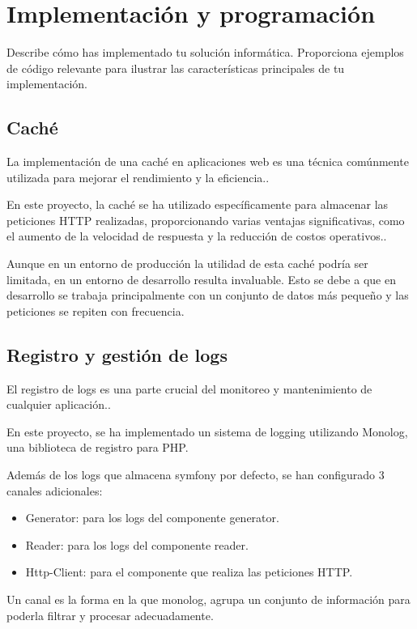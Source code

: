 \section{Implementación y programación}\label{sec:Implemetación y programación}

Describe cómo has implementado tu solución informática.
Proporciona ejemplos de código relevante para ilustrar las características principales de tu implementación.

\subsection*{Caché}
La implementación de una caché en aplicaciones web es una técnica comúnmente utilizada para mejorar el rendimiento y la
eficiencia..

En este proyecto, la caché se ha utilizado específicamente para almacenar las peticiones HTTP realizadas, proporcionando
varias ventajas significativas, como el aumento de la velocidad de respuesta y la reducción de costos operativos..

Aunque en un entorno de producción la utilidad de esta caché podría ser limitada, en un entorno de desarrollo resulta
invaluable. Esto se debe a que en desarrollo se trabaja principalmente con un conjunto de datos más pequeño y las
peticiones se repiten con frecuencia.

\subsection*{Registro y gestión de logs}
El registro de logs es una parte crucial del monitoreo y mantenimiento de cualquier aplicación..

En este proyecto, se ha implementado un sistema de logging utilizando Monolog, una biblioteca de registro para PHP.

Además de los logs que almacena symfony por defecto, se han configurado 3 canales adicionales:

\begin{itemize}
    \item Generator: para los logs del componente generator.
    \item Reader: para los logs del componente reader.
    \item Http-Client: para el componente que realiza las peticiones HTTP.
\end{itemize}

Un canal es la forma en la que monolog, agrupa un conjunto de información para poderla filtrar y procesar adecuadamente.

